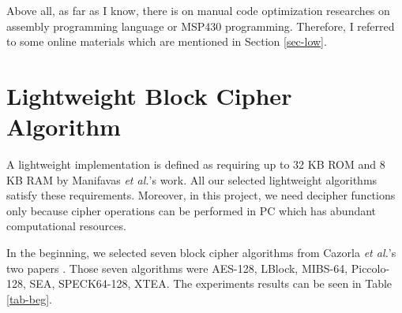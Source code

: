 \documentclass[sigconf, review=false]{acmart}
\begin{document}
Above all, as far as I know, there is on manual code optimization researches
on assembly programming language or MSP430 programming.
Therefore, I referred to some online materials which are mentioned in Section \ref{sec-low}.


\section{Lightweight Block Cipher Algorithm} \label{sec-block}

A lightweight implementation is defined as requiring up to 32 KB ROM and 8 KB RAM by Manifavas \textit{et al.}'s work\cite{manifavas2014lightweight}.
All our selected lightweight algorithms satisfy these requirements.
Moreover, in this project, we need decipher functions only because cipher operations can be performed in PC which has abundant computational resources.

In the beginning, we selected seven block cipher algorithms from Cazorla \textit{et al.}'s two papers \cite{cazorla2013survey, cazorla2015survey}.
Those seven algorithms were AES-128\cite{pub2001197}, LBlock\cite{wu2011lblock}, MIBS-64\cite{izadi2009mibs},
Piccolo-128\cite{shibutani2011piccolo}, SEA\cite{standaert2006sea}, SPECK64-128\cite{beaulieu2015simon}, XTEA\cite{needham1997tea, wheeler1998correction}.
The experiments results can be seen in Table \ref{tab-beg}.
\end{document}
